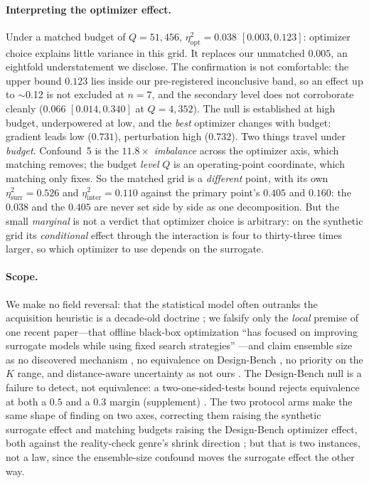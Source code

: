 \documentclass[letterpaper]{article} %
\theoremstyle{plain}
\newcommand{\mdemph}[1]{\emph{#1}}
\begin{document}
\paragraph{Interpreting the optimizer effect.} Under a matched budget of $Q{=}51{,}456$, $\eta^2_{\text{opt}}=0.038$ $[0.003,0.123]$: optimizer choice explains little variance in this grid. It replaces our unmatched $0.005$, an eightfold understatement we disclose. The confirmation is not comfortable: the upper bound $0.123$ lies inside our pre-registered inconclusive band, so an effect up to $\sim$0.12 is not excluded at $n{=}7$, and the secondary level does not corroborate cleanly ($0.066$ $[0.014,0.340]$ at $Q{=}4{,}352$). The null is established at high budget, underpowered at low, and the \mdemph{best} optimizer changes with budget: gradient leads low ($0.731$), perturbation high ($0.732$). Two things travel under \mdemph{budget}. Confound~5 is the $11.8\times$ \mdemph{imbalance} across the optimizer axis, which matching removes; the budget \mdemph{level} $Q$ is an operating-point coordinate, which matching only fixes. So the matched grid is a \mdemph{different} point, with its own $\eta^2_{\text{surr}}{=}0.526$ and $\eta^2_{\text{inter}}{=}0.110$ against the primary point's $0.405$ and $0.160$: the $0.038$ and the $0.405$ are never set side by side as one decomposition. But the small \mdemph{marginal} is not a verdict that optimizer choice is arbitrary: on the synthetic grid its \mdemph{conditional} effect through the interaction is four to thirty-three times larger, so which optimizer to use depends on the surrogate.

\paragraph{Scope.} We make no field reversal: that the statistical model often outranks the acquisition heuristic is a decade-old doctrine \citep{shahriari2016humanoutoftheloop}; we falsify only the \mdemph{local} premise of one recent paper---that offline black-box optimization ``has focused on improving surrogate models while using fixed search strategies'' \citep{chemingui2024pggs}---and claim ensemble size as no discovered mechanism \citep{li2024bnnsurrogates,abe2022ensembles}, no equivalence on Design-Bench \citep{agarwal2021precipice,lakens2017equivalence}, no priority on the $K$ range, and distance-aware uncertainty as not ours \citep{liu2020sngp,vanamersfoort2020duq}. The Design-Bench null is a failure to detect, not equivalence: a two-one-sided-tests bound rejects equivalence at both a $0.5$ and a $0.3$ margin (supplement) \citep{lakens2017equivalence}. The two protocol arms make the same shape of finding on two axes, correcting them raising the synthetic surrogate effect and matching budgets raising the Design-Bench optimizer effect, both against the reality-check genre's shrink direction \citep{melis2018sota}; but that is two instances, not a law, since the ensemble-size confound moves the surrogate effect the other way.
\end{document}
